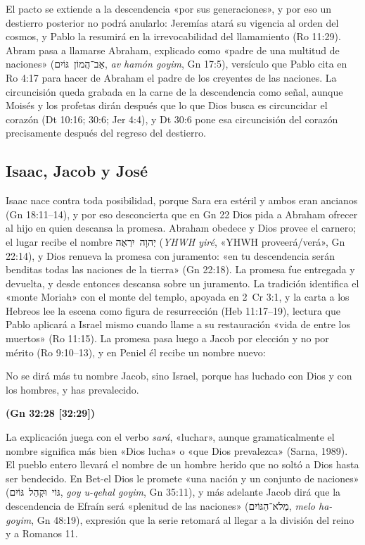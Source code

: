 \documentclass[11pt,letterpaper]{article}
\newcommand{\heb}[1]{\mbox{\foreignlanguage{hebrew}{#1}}}
\newcommand{\fuente}[1]{\par\hfill{\upshape\bfseries\small\textcolor{ladrillo}{#1}}}
\begin{document}
El pacto se extiende a la descendencia «por sus generaciones», y por eso un destierro posterior no podrá anularlo: Jeremías atará su vigencia al orden del cosmos, y Pablo la resumirá en la irrevocabilidad del llamamiento (Ro 11:29). Abram pasa a llamarse Abraham, explicado como «padre de una multitud de naciones» (\heb{אַב־הֲמוֹן גּוֹיִם}, \emph{av hamón goyim}, Gn 17:5), versículo que Pablo cita en Ro 4:17 para hacer de Abraham el padre de los creyentes de las naciones. La circuncisión queda grabada en la carne de la descendencia como señal, aunque Moisés y los profetas dirán después que lo que Dios busca es circuncidar el corazón (Dt 10:16; 30:6; Jer 4:4), y Dt 30:6 pone esa circuncisión del corazón precisamente después del regreso del destierro.

\subsection{Isaac, Jacob y José}
Isaac nace contra toda posibilidad, porque Sara era estéril y ambos eran ancianos (Gn 18:11–14), y por eso desconcierta que en Gn 22 Dios pida a Abraham ofrecer al hijo en quien descansa la promesa. Abraham obedece y Dios provee el carnero; el lugar recibe el nombre \heb{יְהוָה יִרְאֶה} (\emph{YHWH yiré}, «YHWH proveerá/verá», Gn 22:14), y Dios renueva la promesa con juramento: «en tu descendencia serán benditas todas las naciones de la tierra» (Gn 22:18). La promesa fue entregada y devuelta, y desde entonces descansa sobre un juramento. La tradición identifica el «monte Moriah» con el monte del templo, apoyada en 2~Cr 3:1, y la carta a los Hebreos lee la escena como figura de resurrección (Heb 11:17–19), lectura que Pablo aplicará a Israel mismo cuando llame a su restauración «vida de entre los muertos» (Ro 11:15). La promesa pasa luego a Jacob por elección y no por mérito (Ro 9:10–13), y en Peniel él recibe un nombre nuevo:

\begin{cita}No se dirá más tu nombre Jacob, sino Israel, porque has luchado con Dios y con los hombres, y has prevalecido.\fuente{(Gn 32:28 [32:29])}\end{cita}

La explicación juega con el verbo \emph{sará}, «luchar», aunque gramaticalmente el nombre significa más bien «Dios lucha» o «que Dios prevalezca» (Sarna, 1989). El pueblo entero llevará el nombre de un hombre herido que no soltó a Dios hasta ser bendecido. En Bet-el Dios le promete «una nación y un conjunto de naciones» (\heb{גּוֹי וּקְהַל גּוֹיִם}, \emph{goy u-qehal goyim}, Gn 35:11), y más adelante Jacob dirá que la descendencia de Efraín será «plenitud de las naciones» (\heb{מְלֹא־הַגּוֹיִם}, \emph{melo ha-goyim}, Gn 48:19), expresión que la serie retomará al llegar a la división del reino y a Romanos 11.
\end{document}
